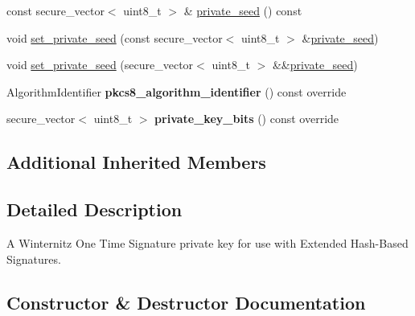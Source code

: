 \begin{DoxyCompactItemize}
\item 
const secure\+\_\+vector$<$ uint8\+\_\+t $>$ \& \hyperlink{class_botan_1_1_x_m_s_s___w_o_t_s___private_key_a401b9dde3140edf386dba700b880b265}{private\+\_\+seed} () const
\item 
void \hyperlink{class_botan_1_1_x_m_s_s___w_o_t_s___private_key_abd67c12003a5600b9aaed25b91a96fa5}{set\+\_\+private\+\_\+seed} (const secure\+\_\+vector$<$ uint8\+\_\+t $>$ \&\hyperlink{class_botan_1_1_x_m_s_s___w_o_t_s___private_key_a401b9dde3140edf386dba700b880b265}{private\+\_\+seed})
\item 
void \hyperlink{class_botan_1_1_x_m_s_s___w_o_t_s___private_key_a497d20e641d7234d56657e52d307026b}{set\+\_\+private\+\_\+seed} (secure\+\_\+vector$<$ uint8\+\_\+t $>$ \&\&\hyperlink{class_botan_1_1_x_m_s_s___w_o_t_s___private_key_a401b9dde3140edf386dba700b880b265}{private\+\_\+seed})
\item 
\mbox{\label{class_botan_1_1_x_m_s_s___w_o_t_s___private_key_ab1196093bad75d74ad7dcfce348443a1}} 
Algorithm\+Identifier {\bfseries pkcs8\+\_\+algorithm\+\_\+identifier} () const override
\item 
\mbox{\label{class_botan_1_1_x_m_s_s___w_o_t_s___private_key_ae661f3ead31edfa4a9c1de6975da29d2}} 
secure\+\_\+vector$<$ uint8\+\_\+t $>$ {\bfseries private\+\_\+key\+\_\+bits} () const override
\end{DoxyCompactItemize}
\subsection*{Additional Inherited Members}


\subsection{Detailed Description}
A Winternitz One Time Signature private key for use with Extended Hash-\/\+Based Signatures. 

\subsection{Constructor \& Destructor Documentation}
\mbox{\label{class_botan_1_1_x_m_s_s___w_o_t_s___private_key_a2f1058b65a5dfc523afd1f7bc93297a2}} 
